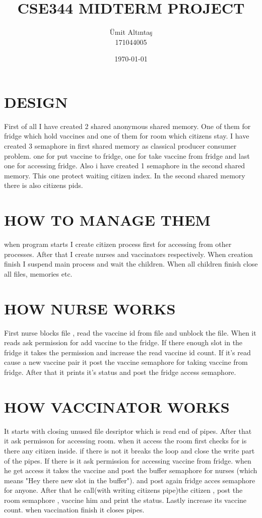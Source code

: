 \documentclass{article}
\title{CSE344 MIDTERM PROJECT}
\author{Ümit Altıntaş \\ 171044005}
\date{\today}
\begin{document}
\maketitle
\section{DESIGN}
First of all I have created 2 shared anonymous shared memory. One of them for fridge which hold vaccines and one of them for room which citizens stay.
I have created 3 semaphore in first shared memory as classical producer consumer problem. one for put vaccine to fridge, one for take vaccine from fridge and last one for accessing fridge. Also i have created 1 semaphore in the second shared memory. This one protect  waiting citizen index. In the second shared memory there is also citizens pids.
\section{HOW TO MANAGE THEM}
when program starts I create citizen process first for accessing from other processes.
After that I create nurses and vaccinators respectively. When creation finish I  suspend main process and wait the children. When all children finish close all files, memories etc.
\section{HOW NURSE WORKS}
First nurse blocks file , read the vaccine id from file and unblock the file. When it reads ask  permission  for add vaccine to the fridge. If there enough slot in the fridge it takes the permission and increase the read vaccine id count. If it's read cause a new vaccine pair it post the vaccine semaphore for taking vaccine from fridge.
After that it prints it's status and post the fridge access semaphore. 


\section{HOW VACCINATOR WORKS}
It starts with closing unused file desriptor which is read end of pipes.
After that it ask permisson for accessing room. when it access the room first checks for is there any citizen inside. if there is not it breaks the loop and close the write part of the pipes. If there is it ask permission for accessing vaccine from fridge. when he get access  it takes the vaccine and post the buffer semaphore for nurses (which means "Hey there new slot in the buffer"). and post again fridge acces semaphore for anyone. After that he call(with writing citizens pipe)the citizen , post the room semaphore  , vaccine him and print the status. Lastly increase its vaccine count.
when vaccination finish it closes pipes.
\end{document}
